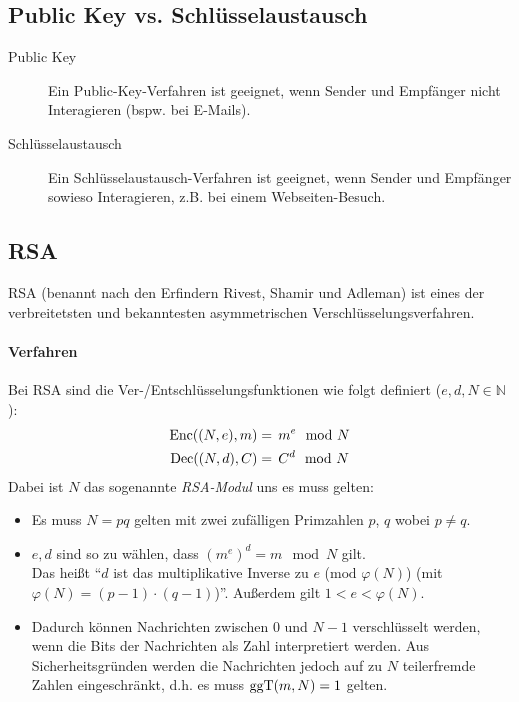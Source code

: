 		\subsection{Public Key vs. Schlüsselaustausch}
			\begin{description}
				\item[Public Key] Ein Public-Key-Verfahren ist geeignet, wenn Sender und Empfänger nicht Interagieren (bspw. bei E-Mails).
				\item[Schlüsselaustausch] Ein Schlüsselaustausch-Verfahren ist geeignet, wenn Sender und Empfänger sowieso Interagieren, z.B. bei einem Webseiten-Besuch.
			\end{description}

		\subsection{RSA}
			RSA (benannt nach den Erfindern Rivest, Shamir und Adleman) ist eines der verbreitetsten und bekanntesten asymmetrischen Verschlüsselungsverfahren.

			\paragraph{Verfahren}
				Bei RSA sind die Ver-/Entschlüsselungsfunktionen wie folgt definiert (\( e, d, N \in \mathbb{N} \)):
				\begin{align*}
					\operatorname{Enc}((N, e), m) & =\, m ^ e \mod N \\
					\operatorname{Dec}((N, d), C) & =\, C ^ d \mod N
				\end{align*}
				Dabei ist \(N\) das sogenannte \textit{RSA-Modul} uns es muss gelten:
				\begin{itemize}
					\item Es muss \( N = pq \) gelten mit zwei zufälligen Primzahlen \( p \), \( q \) wobei \( p \neq q \).
					\item \( e, d \) sind so zu wählen, dass \( (m ^ e) ^ d = m \mod N \) gilt. \\ Das heißt \enquote{\(d\) ist das multiplikative Inverse zu \( e \) (\( \textrm{mod } \varphi(N) \)) (mit \( \varphi(N) = (p - 1) \cdot (q - 1) \))}. Außerdem gilt \( 1 < e < \varphi(N) \).
					\item Dadurch können Nachrichten zwischen \( 0 \) und \( N - 1 \) verschlüsselt werden, wenn die Bits der Nachrichten als Zahl interpretiert werden. Aus Sicherheitsgründen werden die Nachrichten jedoch auf zu \(N\) teilerfremde Zahlen eingeschränkt, d.h. es muss \( \textrm{ggT}(m, N) = 1 \) gelten.
				\end{itemize}


